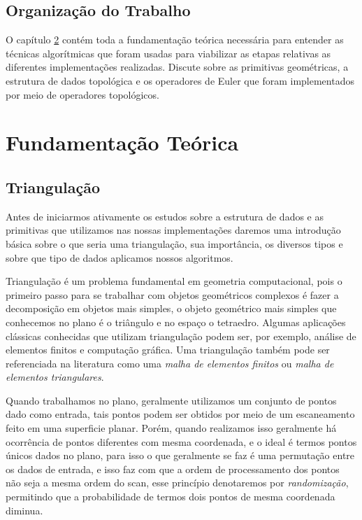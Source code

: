 \documentclass[12pt,a4paper]{book}
\begin{document}
\section{Organiza\c{c}\~{a}o do Trabalho}

O cap\'itulo \ref{chapter2} cont\'em toda a fundamenta\c{c}\~{a}o te\'orica necess\'aria para entender as t\'ecnicas algor\'itmicas que foram usadas para viabilizar as etapas 
relativas as diferentes implementa\c{c}\~{o}es realizadas. Discute sobre as primitivas geom\'etricas, a estrutura de dados topol\'ogica e os operadores de Euler que foram implementados por meio de operadores topol\'ogicos.

\chapter{Fundamenta\c{c}\~{a}o Te\'orica} \label{chapter2}

\section{Triangula\c{c}\~{a}o}

Antes de iniciarmos ativamente os estudos sobre a estrutura de dados e as primitivas que utilizamos nas nossas implementa\c{c}\~{o}es daremos uma introdu\c{c}\~{a}o b\'asica sobre o que seria uma triangula\c{c}\~{a}o, sua import\^ancia, os diversos tipos e sobre que tipo de dados aplicamos nossos algoritmos.

Triangula\c{c}\~{a}o \'e um problema fundamental em geometria computacional, pois o primeiro passo para se trabalhar com objetos geom\'etricos complexos \'e fazer a decomposi\c{c}\~{a}o em objetos mais simples, o objeto geom\'etrico mais simples que conhecemos no plano \'e o tri\^angulo e no espa\c{c}o o tetraedro. Algumas aplica\c{c}\~{o}es cl\'assicas conhecidas que utilizam triangula\c{c}\~{a}o podem ser, por exemplo, an\'alise de elementos finitos e computa\c{c}\~{a}o gr\'afica. Uma triangula\c{c}\~{a}o tamb\'em pode ser referenciada na literatura como uma \textit{malha de elementos finitos} \cite{piteri1} ou \textit{malha de elementos triangulares}.

Quando trabalhamos no plano, geralmente utilizamos um conjunto de pontos dado como entrada, tais pontos podem ser obtidos por meio de um escaneamento feito em uma superficie planar. Por\'em, quando realizamos isso geralmente h\'a ocorr\^encia de pontos diferentes com mesma coordenada, e o ideal \'e termos pontos \'unicos dados no plano, para isso o que geralmente se faz \'e uma permuta\c{c}\~{a}o entre os dados de entrada, e isso faz com que a ordem de processamento dos pontos n\~ao seja a mesma ordem do scan, esse princ\'ipio denotaremos por \textit{randomiza\c{c}\~{a}o}\cite{guibas}, permitindo que a probabilidade de termos dois pontos de mesma coordenada diminua.
\end{document}

